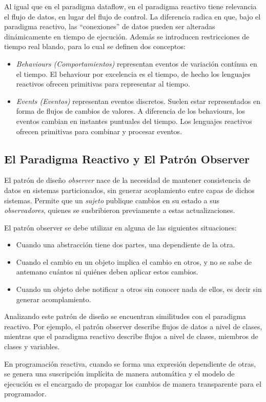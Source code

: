 Al igual que en el paradigma dataflow, en el paradigma reactivo tiene relevancia
el flujo de datos, en lugar del flujo de control.
La diferencia radica en que, bajo el paradigma reactivo, las ``conexiones'' de
datos pueden ser alteradas dinámicamente en tiempo de ejecución.
Además se introducen restricciones de tiempo real blando, para lo cual se
definen dos conceptos:
\begin{itemize}
  \item \textit{Behaviours (Comportamientos)} representan eventos de variación
  contínua en el tiempo. El behaviour por excelencia es el tiempo, de hecho los
  lenguajes reactivos ofrecen primitivas para representar al tiempo.
  \item \textit{Events (Eventos)} representan eventos discretos. Suelen estar
  representados en forma de flujos de cambios de valores. A diferencia de los
  behaviours, los eventos cambian en instantes puntuales del tiempo. Los
  lenguajes reactivos ofrecen primitivas para combinar y procesar eventos.
\end{itemize}
\cite{Bainomugisha:2013:SRP:2501654.2501666}

\subsection*{El Paradigma Reactivo y El Patrón Observer}

El patrón de diseño \textit{observer} \cite{Gamma:1995:DPE:186897} nace de la
necesidad de mantener consistencia de datos en sistemas particionados, sin generar
acoplamiento entre capas de dichos sistemas.
Permite que un \textit{sujeto} publique cambios en su estado a sus
\textit{observadores}, quienes se susbribieron previamente a estas
actualizaciones.

El patrón observer se debe utilizar en alguna de las siguientes situaciones:
\begin{itemize}
  \item Cuando una abstracción tiene dos partes, una dependiente de la otra.
  \item Cuando el cambio en un objeto implica el cambio en otros, y no se sabe
  de antemano cuántos ni quiénes deben aplicar estos cambios.
  \item Cuando un objeto debe notificar a otros sin conocer nada de ellos, es
  decir sin generar acomplamiento.
\end{itemize}
\cite{Gamma:1995:DPE:186897}

Analizando este patrón de diseño se encuentran similitudes con el paradigma
reactivo. Por ejemplo, el patrón observer describe flujos de datos a nivel de
clases, mientras que el paradigma reactivo describe flujos a nivel de clases,
miembros de clases y variables.

En programación reactiva, cuando se forma una expresión dependiente de otras, se
genera una suscripción implícita de manera automática y el modelo de ejecución
es el encargado de propagar los cambios de manera transparente para el
programador.

